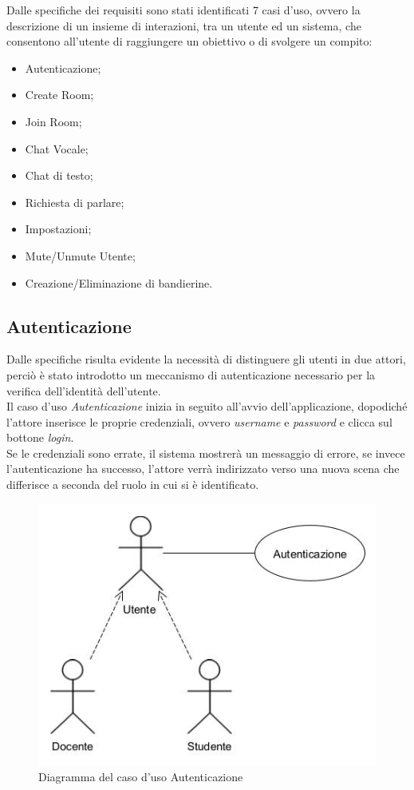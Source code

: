 \hspace*{-0.6cm}Dalle specifiche dei requisiti sono stati identificati 7 casi d'uso, ovvero la descrizione di un insieme di interazioni, tra un utente ed un sistema, che consentono all'utente di raggiungere un obiettivo o di svolgere un compito:
\begin{itemize}
\item Autenticazione;
\item Create Room;
\item Join Room;
\item Chat Vocale;
\item Chat di testo;
\item Richiesta di parlare;
\item Impostazioni;
\item Mute/Unmute Utente;
\item Creazione/Eliminazione di bandierine.
\end{itemize}
\subsection{Autenticazione}
Dalle specifiche risulta evidente  la  necessità  di  distinguere  gli  utenti  in  due  attori, perciò è stato introdotto un meccanismo di autenticazione necessario per la verifica dell'identità dell'utente.
\\Il caso d'uso \textit{Autenticazione} inizia in seguito all'avvio dell'applicazione, dopodiché l'attore inserisce le proprie credenziali, ovvero \textit{username} e \textit{password} e clicca sul bottone \textit{login}.
\\Se le credenziali sono errate, il sistema mostrerà un messaggio di errore, se invece l'autenticazione ha successo, l'attore verrà indirizzato verso una nuova scena che differisce a seconda del ruolo in cui si è identificato.
\begin{figure}[H]
    \centering
    \includegraphics[scale=0.5]{Immagini/LoginUseCase.jpg}
    \caption{Diagramma del caso d'uso Autenticazione}
    \label{fig:my_label}
\end{figure}
